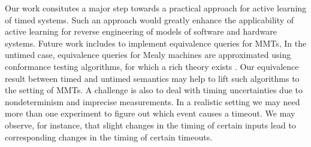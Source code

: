 \iflong
Our work consitutes a major step towards a practical approach for active learning of timed systems.
Such an approach would greatly enhance the applicability of active learning for reverse engineering of models of
software and hardware systems.
\fi
Future work includes to implement equivalence queries for MMTs,
In the untimed case, equivalence queries for Mealy machines are approximated using conformance testing algorithms,
for which a rich theory exists \cite{LeeY96}.
\iflong
Our equivalence result between timed and untimed semantics may help to
lift such algorithms to the setting of MMTs.
\fi
A challenge is also to deal with timing uncertainties due to nondeterminism  and imprecise measurements.
\iflong
In a realistic
setting we may need more than one experiment to figure out which event causes a timeout. We may observe, for instance,
that slight changes in the timing of certain inputs lead to corresponding changes in the timing of certain timeouts.
\fi
%
%
%

